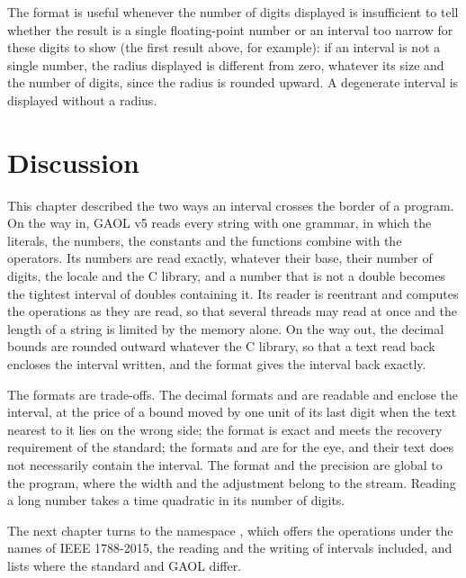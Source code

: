 \documentclass[12pt,a4paper,twoside,openright]{book}
\begin{document}
The format  is useful whenever the number of digits
displayed is insufficient to tell whether the result is a single
floating-point number or an interval too narrow for these digits to show
(the first result above, for example): if an interval is not a single
number, the radius displayed is different from zero, whatever its size and
the number of digits, since the radius is rounded upward. A degenerate
interval is displayed without a radius.

\section{Discussion}

This chapter described the two ways an interval crosses the border of a
program. On the way in, GAOL v5 reads every string with one grammar, in
which the literals, the numbers, the constants and the functions combine
with the operators. Its numbers are read exactly, whatever their base, their
number of digits, the locale and the C library, and a number that is not a
double becomes the tightest interval of doubles containing it. Its reader
is reentrant and computes the operations as they are read, so that several
threads may read at once and the length of a string is limited by the
memory alone. On the way out, the decimal bounds are rounded outward
whatever the C library, so that a text read back encloses the interval
written, and the format  gives the interval back exactly.

\medskip
The formats are trade-offs. The decimal formats  and
 are readable and enclose the interval, at the price of a
bound moved by one unit of its last digit when the text nearest to it lies
on the wrong side; the format  is exact and meets the recovery
requirement of the standard; the formats  and
 are for the eye, and their text does not necessarily
contain the interval. The format and the precision are global to the
program, where the width and the adjustment belong to the stream. Reading a
long number takes a time quadratic in its number of digits.

\medskip
The next chapter turns to the namespace , which offers
the operations under the names of IEEE 1788-2015, the reading and the
writing of intervals included, and lists where the standard and GAOL
differ.

\end{document}
